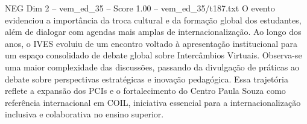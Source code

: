 \begin{textsample}{NEG Dim 2 – vem\_ed\_35 – Score 1.00 – vem\_ed\_35/t187.txt}
O evento evidenciou a importância da troca cultural e da formação global dos estudantes, além de dialogar com agendas mais amplas de internacionalização.
Ao longo dos anos, o IVES evoluiu de um encontro voltado à apresentação institucional para um espaço consolidado de debate global sobre Intercâmbios Virtuais.
Observa-se uma maior complexidade das discussões, passando da divulgação de práticas ao debate sobre perspectivas estratégicas e inovação pedagógica.
Essa trajetória reflete a expansão dos PCIs e o fortalecimento do Centro Paula Souza como referência internacional em COIL, iniciativa essencial para a internacionalização inclusiva e colaborativa no ensino superior.

\end{textsample}
